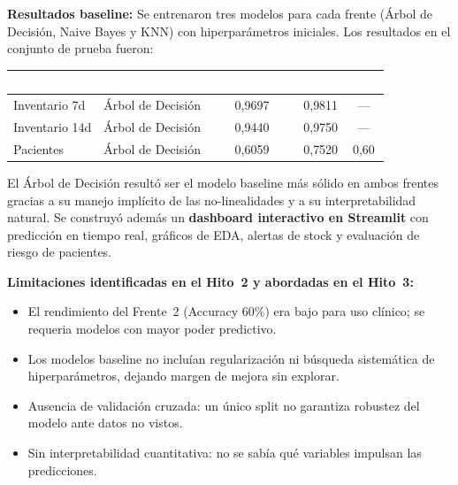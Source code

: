 \documentclass[12pt, a4paper]{article}
\begin{document}
\textbf{Resultados baseline:} Se entrenaron tres modelos para cada frente (\'Arbol de Decisi\'on, Naive Bayes y KNN) con hiperpar\'ametros iniciales. Los resultados en el conjunto de prueba fueron:

\begin{center}
\begin{tabular}{lcccc}
  \toprule
  \rowcolor{primario!90}
  \textcolor{white}{\textbf{Frente}} &
  \textcolor{white}{\textbf{Mejor modelo}} &
  \textcolor{white}{\textbf{$F_1$ / $F_1$-Mac.}} &
  \textcolor{white}{\textbf{AUC}} &
  \textcolor{white}{\textbf{Acc.}} \\
  \midrule
  Inventario 7d  & \'Arbol de Decisi\'on & 0{,}9697 & 0{,}9811 & --- \\
  \rowcolor{grisc}
  Inventario 14d & \'Arbol de Decisi\'on & 0{,}9440 & 0{,}9750 & --- \\
  Pacientes      & \'Arbol de Decisi\'on & 0{,}6059 & 0{,}7520 & 0{,}60 \\
  \bottomrule
\end{tabular}
\end{center}

\vspace{4pt}
El \'Arbol de Decisi\'on result\'o ser el modelo baseline m\'as s\'olido en ambos frentes gracias a su manejo impl\'icito de las no-linealidades y a su interpretabilidad natural. Se construy\'o adem\'as un \textbf{dashboard interactivo en Streamlit} con predicci\'on en tiempo real, gr\'aficos de EDA, alertas de stock y evaluaci\'on de riesgo de pacientes.

\begin{warnbox}
\textbf{Limitaciones identificadas en el Hito~2 y abordadas en el Hito~3:}
\begin{itemize}[leftmargin=1.5em, itemsep=3pt]
  \item El rendimiento del Frente~2 (Accuracy 60\%) era bajo para uso cl\'inico; se requeria modelos con mayor poder predictivo.
  \item Los modelos baseline no inclu\'ian regularizaci\'on ni b\'usqueda sistem\'atica de hiperpar\'ametros, dejando margen de mejora sin explorar.
  \item Ausencia de validaci\'on cruzada: un \'unico split no garantiza robustez del modelo ante datos no vistos.
  \item Sin interpretabilidad cuantitativa: no se sab\'ia qu\'e variables impulsan las predicciones.
\end{itemize}
\end{warnbox}
\end{document}
